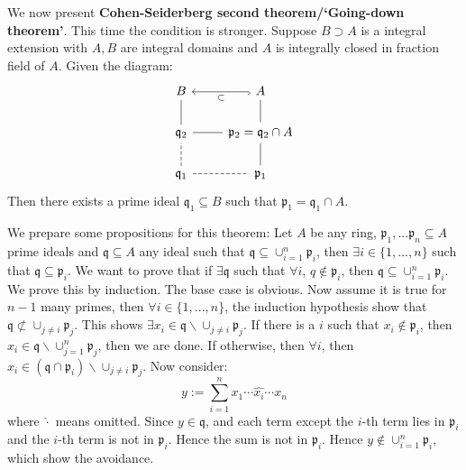 \documentclass[12pt]{article}
\theoremstyle{definition}
\theoremstyle{plain}
\begin{document}
\medskip
We now present \textbf{Cohen-Seiderberg second theorem/`Going-down theorem'}. This time the condition is stronger.
 Suppose $B\supset A$ is a integral extension with $A, B$ are integral domains and $A$ is integrally closed in fraction field of $A$. Given the diagram:
\begin{equation}
  \begin{tikzcd}
    B &A\ar[hook]{l}{\subset}\\
    \mathfrak{q}_2\ar[-]{u}\ar[-]{r}&\mathfrak{p}_2=\mathfrak{q}_2\cap A\ar[-]{u}\\
    \mathfrak{q}_1\ar[-,dashed]{u}\ar[-,dashed]{r}&\mathfrak{p}_1\ar[-]{u}
  \end{tikzcd}
\end{equation}
Then there exists a prime ideal $\mathfrak{q}_1\subseteq B$ such that $\mathfrak{p}_1=\mathfrak{q}_1\cap A$.

We prepare some propositions for this theorem:
 Let $A$ be any ring, $\mathfrak{p}_1,...\mathfrak{p}_n\subseteq A$ prime ideals and $\mathfrak{q}\subseteq A$ any ideal such that $\mathfrak{q}\subseteq \cup_{i=1}^n\mathfrak{p}_i$, then $\exists i\in \{1, ..., n\}$ such that $\mathfrak{q}\subseteq \mathfrak{p}_i$.
\proof We want to prove that if $\exists \mathfrak{q}$ such that $\forall i$, $q\notin \mathfrak{p}_i$, then $\mathfrak{q}\subseteq \cup_{i=1}^n \mathfrak{p}_i$. We prove this by induction. The base case is obvious. Now assume it is true for $n-1$ many primes, then $\forall i\in \{1, ..., n\}$, the induction hypothesis show that $\mathfrak{q}\not\subset \cup_{j\neq i}\mathfrak{p}_j$. This shows $\exists x_i\in \mathfrak{q}\backslash \cup_{j\neq i}\mathfrak{p}_j$. If there is a $i$ such that $x_i\notin \mathfrak{p}_i$, then $x_i\in \mathfrak{q}\backslash \cup_{j=1}^n \mathfrak{p}_j$, then we are done. If otherwise, then $\forall i$, then $x_i\in (\mathfrak{q}\cap \mathfrak{p}_i)\backslash \cup_{j\neq i}\mathfrak{p}_j$. Now consider:
\[y:=\sum_{i=1}^n x_1\cdots \hat{x_i}\cdots x_n\]
where $\hat{\cdot}$ means omitted. Since $y\in \mathfrak{q}$, and each term except the $i$-th term lies in $\mathfrak{p}_i$ and the $i$-th term is not in $\mathfrak{p}_i$. Hence the sum is not in $\mathfrak{p}_i$. Hence $y\notin \cup_{i=1}^n \mathfrak{p}_i$, which show the avoidance. \qedhere
\end{document}

